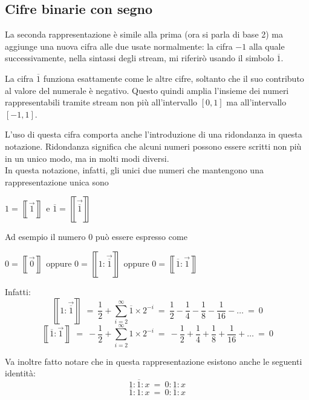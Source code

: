 \documentclass[Lau]{sapthesis}
\begin{document}
\subsection{Cifre binarie con segno}
La seconda rappresentazione \cite{DavePlume} è simile alla prima (ora si parla di base 2) ma 
aggiunge una nuova cifra alle due usate normalmente: la cifra $-1$ alla quale 
successivamente, nella 
sintassi degli stream, mi riferirò usando il simbolo $\overline{1}$.

La cifra $\overline{1}$ funziona esattamente come le altre cifre, soltanto che 
il suo contributo al valore del numerale è negativo. Questo quindi amplia 
l'insieme dei numeri rappresentabili tramite stream non più all'intervallo 
$\left[0,1\right]$ ma all'intervallo $\left[-1,1\right]$.

L'uso di questa cifra comporta anche l'introduzione di una ridondanza in questa 
notazione. Ridondanza significa che alcuni numeri possono essere scritti non più 
in un unico modo, ma in molti modi diversi.\\
In questa notazione, infatti, gli unici due numeri che mantengono una 
rappresentazione unica sono
\begin{center}
$1=\left\llbracket\overrightarrow{1}\right\rrbracket$ \hspace{0.5cm} e 
\hspace{0.5cm} 
$\overline{1}=\left\llbracket\overrightarrow{\overline{1}}\right\rrbracket$
\end{center}
Ad esempio il numero 0 può essere espresso come
\begin{center}
$0=\left\llbracket\overrightarrow{0}\right\rrbracket$ \hspace{0.5cm} oppure 
\hspace{0.5cm} 
$0=\left\llbracket1:\overrightarrow{\overline{1}}\right\rrbracket$ 
\hspace{0.5cm} oppure \hspace{0.5cm}
$0=\left\llbracket\overline{1}:\overrightarrow{1}\right\rrbracket$\\
\end{center}
Infatti:
$$\left\llbracket1:\overrightarrow{\overline{1}}\right\rrbracket\ =\ 
\frac{1}{2}+\sum_{i=2}^{\infty}\overline{1} \times 2^{-i}\ =\ 
\frac{1}{2}-\frac{1}{4}-\frac{1}{8}-\frac{1}{16}-\ldots\ =\ 0$$
$$\left\llbracket\overline{1}:\overrightarrow{1}\right\rrbracket\ =\ 
-\frac{1}{2}+\sum_{i=2}^{\infty} 1 \times 2^{-i}\ =\ 
-\frac{1}{2}+\frac{1}{4}+\frac{1}{8}+\frac{1}{16}+\ldots\ =\ 0$$

Va inoltre fatto notare che in questa rappresentazione esistono anche le seguenti identità:
$$1:\overline{1}:x\ =\ 0:1:x$$
$$\overline{1}:1:x\ =\ 0:\overline{1}:x$$
\end{document}
